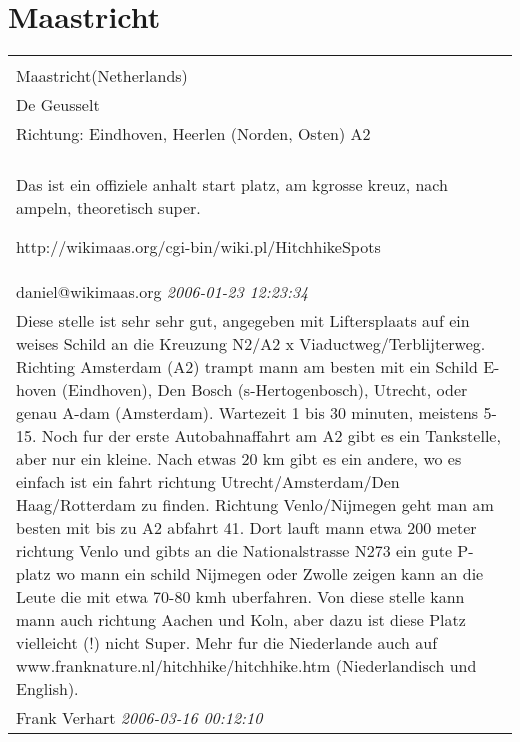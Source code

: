\documentclass[a4paper,12pt]{article}
\begin{document}
\section{Maastricht}
\begin{tabular}{|p{13cm}|}
\hline\\
Maastricht(Netherlands)\\
De Geusselt\\
Richtung: Eindhoven, Heerlen (Norden, Osten) A2 \\
\hline\\
Das ist ein offiziele anhalt start platz, am kgrosse kreuz, nach ampeln, theoretisch super.

http://wikimaas.org/cgi-bin/wiki.pl/HitchhikeSpots \\
daniel@wikimaas.org \textit{ 2006-01-23 12:23:34 }\\\hline Diese stelle ist sehr sehr gut, angegeben mit Liftersplaats auf ein weises Schild an die Kreuzung N2/A2 x Viaductweg/Terblijterweg. Richting Amsterdam (A2) trampt mann am besten mit ein Schild E-hoven (Eindhoven), Den Bosch (s-Hertogenbosch), Utrecht, oder genau A-dam (Amsterdam). Wartezeit 1 bis 30 minuten, meistens 5-15. Noch fur der erste Autobahnaffahrt am A2 gibt es ein Tankstelle, aber nur ein kleine. Nach etwas 20 km gibt es ein andere, wo es einfach ist ein fahrt richtung Utrecht/Amsterdam/Den Haag/Rotterdam zu finden. Richtung Venlo/Nijmegen geht man am besten mit bis zu A2 abfahrt 41. Dort lauft mann etwa 200 meter richtung Venlo und gibts an die Nationalstrasse N273 ein gute P-platz wo mann ein schild Nijmegen oder Zwolle zeigen kann an die Leute die mit etwa 70-80 kmh uberfahren. Von diese stelle kann mann auch richtung Aachen und Koln, aber dazu ist diese Platz vielleicht (!) nicht Super.
Mehr fur die Niederlande auch auf www.franknature.nl/hitchhike/hitchhike.htm (Niederlandisch und English). \\
Frank Verhart \textit{ 2006-03-16 00:12:10 }\\\hline
\end{tabular}
\end{document}
